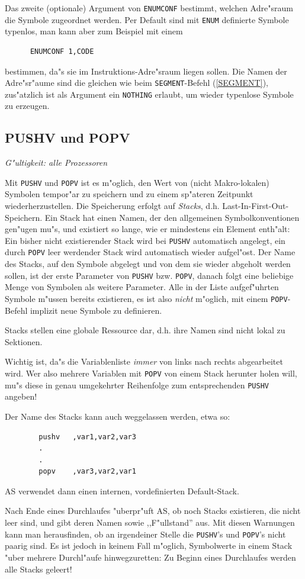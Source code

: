 \documentclass[12pt,a4paper,twoside]{report}
\makeatletter
\newcommand{\tty}[1]{{\tt #1}}
\newcommand{\ttindex}[1]{\index{#1@{\tt #1}}}
\newcommand{\asname}{AS}
\makeatother
\begin{document}
Das zweite (optionale) Argument von \tty{ENUMCONF} bestimmt,
welchen Adre"sraum die Symbole zugeordnet werden.  Per Default
sind mit \tty{ENUM} definierte Symbole typenlos, man kann aber
zum Beispiel mit einem
\begin{verbatim}
      ENUMCONF 1,CODE
\end{verbatim}  
bestimmen, da"s sie im Instruktions-Adre"sraum liegen sollen.  Die
Namen der Adre"sr"aume sind die gleichen wie beim
\tty{SEGMENT}-Befehl (\ref{SEGMENT}), zus"atzlich ist als
Argument ein \tty{NOTHING} erlaubt, um wieder typenlose Symbole
zu erzeugen.


\subsection{PUSHV und POPV}
\ttindex{PUSHV}\ttindex{POPV}

{\em G"ultigkeit: alle Prozessoren}

Mit \tty{PUSHV} und \tty{POPV} ist es m"oglich, den Wert von (nicht
Makro-lokalen) Symbolen tempor"ar zu speichern und zu einem sp"ateren
Zeitpunkt wiederherzustellen.  Die Speicherung erfolgt auf {\em Stacks},
d.h. Last-In-First-Out-Speichern.  Ein Stack hat einen Namen, der den
allgemeinen Symbolkonventionen gen"ugen mu"s, und existiert so lange,
wie er mindestens ein Element enth"alt: Ein bisher nicht existierender
Stack wird bei \tty{PUSHV} automatisch angelegt, ein durch \tty{POPV} leer
werdender Stack wird automatisch wieder aufgel"ost.  Der Name des Stacks,
auf den Symbole abgelegt und von dem sie wieder abgeholt werden sollen,
ist der erste Parameter von \tty{PUSHV} bzw. \tty{POPV}, danach folgt
eine beliebige Menge von Symbolen als weitere Parameter.  Alle in der
Liste aufgef"uhrten Symbole m"ussen bereits existieren, es ist also
{\em nicht} m"oglich, mit einem \tty{POPV}-Befehl implizit neue Symbole
zu definieren.
\par
Stacks stellen eine globale Ressource dar, d.h. ihre Namen sind
nicht lokal zu Sektionen.
\par
Wichtig ist, da"s die Variablenliste {\em immer} von links nach rechts
abgearbeitet wird.  Wer also mehrere Variablen mit \tty{POPV} von einem
Stack herunter holen will, mu"s diese in genau umgekehrter Reihenfolge
zum entsprechenden \tty{PUSHV} angeben!
\par
Der Name des Stacks kann auch weggelassen werden, etwa so:
\begin{verbatim}
        pushv   ,var1,var2,var3
        .
        .
        popv    ,var3,var2,var1
\end{verbatim}
\asname{} verwendet dann einen internen, vordefinierten Default-Stack.
\par
Nach Ende eines Durchlaufes "uberpr"uft \asname{}, ob noch Stacks existieren,
die nicht leer sind, und gibt deren Namen sowie ,,F"ullstand'' aus.  Mit
diesen Warnungen kann man herausfinden, ob an irgendeiner Stelle die
\tty{PUSHV}'s und \tty{POPV}'s nicht paarig sind.  Es ist jedoch in
keinem Fall m"oglich, Symbolwerte in einem Stack "uber mehrere Durchl"aufe
hinwegzuretten: Zu Beginn eines Durchlaufes werden alle Stacks geleert!
\end{document}
